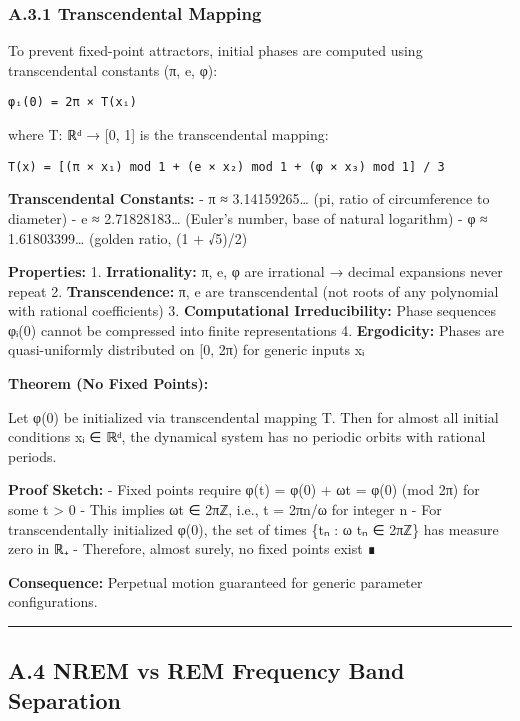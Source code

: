 \documentclass[
]{article}
\begin{document}
\subsubsection{A.3.1 Transcendental
Mapping}\label{a.3.1-transcendental-mapping}

To prevent fixed-point attractors, initial phases are computed using
transcendental constants (π, e, φ):

\begin{verbatim}
φᵢ(0) = 2π × T(xᵢ)
\end{verbatim}

where T: ℝᵈ → {[}0, 1{]} is the transcendental mapping:

\begin{verbatim}
T(x) = [(π × x₁) mod 1 + (e × x₂) mod 1 + (φ × x₃) mod 1] / 3
\end{verbatim}

\textbf{Transcendental Constants:} - π ≈ 3.14159265\ldots{} (pi, ratio
of circumference to diameter) - e ≈ 2.71828183\ldots{} (Euler's number,
base of natural logarithm) - φ ≈ 1.61803399\ldots{} (golden ratio, (1 +
√5)/2)

\textbf{Properties:} 1. \textbf{Irrationality:} π, e, φ are irrational →
decimal expansions never repeat 2. \textbf{Transcendence:} π, e are
transcendental (not roots of any polynomial with rational coefficients)
3. \textbf{Computational Irreducibility:} Phase sequences φᵢ(0) cannot
be compressed into finite representations 4. \textbf{Ergodicity:} Phases
are quasi-uniformly distributed on {[}0, 2π) for generic inputs xᵢ

\textbf{Theorem (No Fixed Points):}

Let φ(0) be initialized via transcendental mapping T. Then for almost
all initial conditions xᵢ ∈ ℝᵈ, the dynamical system has no periodic
orbits with rational periods.

\textbf{Proof Sketch:} - Fixed points require φ(t) = φ(0) + ωt = φ(0)
(mod 2π) for some t \textgreater{} 0 - This implies ωt ∈ 2πℤ, i.e., t =
2πn/ω for integer n - For transcendentally initialized φ(0), the set of
times \{tₙ : ω tₙ ∈ 2πℤ\} has measure zero in ℝ₊ - Therefore, almost
surely, no fixed points exist ∎

\textbf{Consequence:} Perpetual motion guaranteed for generic parameter
configurations.

\begin{center}\rule{0.5\linewidth}{0.5pt}\end{center}

\subsection{A.4 NREM vs REM Frequency Band
Separation}\label{a.4-nrem-vs-rem-frequency-band-separation}
\end{document}
